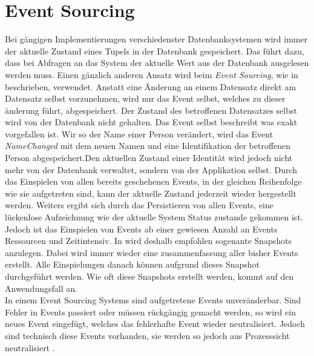 \section{Event Sourcing}
Bei gängigen Implementierungen verschiedenster Datenbanksystemen wird immer der aktuelle Zustand eines Tupels in der Datenbank gespeichert. Das führt dazu, dass bei Abfragen an das System der aktuelle Wert aus der Datenbank ausgelesen werden muss. Einen gänzlich anderen Ansatz wird beim \textit{Event Sourcing}, wie in \cite{vernon2013implementing} beschrieben, verwendet. Anstatt eine Änderung an einem Datensatz direkt am Datensatz selbst vorzunehmen, wird nur das Event selbst, welches zu dieser änderung führt, abgespeichert. Der Zustand des betroffenen Datensatzes selbst wird von der Datenbank nicht gehalten. Das Event selbst beschreibt was exakt vorgefallen ist. Wir so der Name einer Person verändert, wird das Event \textit{NameChanged} mit dem neuen Namen und eine Identifikation der betroffenen Person abgespeichert.Den aktuellen Zustand einer Identität wird jedoch nicht mehr von der Datenbank verwaltet, sondern von der Applikation selbst. Durch das Einspielen von allen bereits geschehenen Events, in der gleichen Reihenfolge wie sie aufgetreten sind, kann der aktuelle Zustand jederzeit wieder hergestellt werden. Weiters ergibt sich durch das Persistieren von allen Events, eine lückenlose Aufzeichnung wie der aktuelle System Status zustande gekommen ist. \cite{vernon2013implementing} 
Jedoch ist das Einspielen von Events ab einer gewiesen Anzahl an Events Ressourcen und Zeitintensiv. In \cite{vernon2013implementing} wird deshalb empfohlen sogenante Snapshots anzulegen. Dabei wird immer wieder eine zusammenfassung aller bisher Events erstellt. Alle Einspielungen danach können aufgrund dieses Snapshot durchgeführt werden. Wie oft diese Snapshots erstellt werden, kommt auf den Anwendungsfall an. \\
In einem Event Sourcing Systems sind aufgetretene Events unveränderbar. Sind Fehler in Events passiert oder müssen rückgängig gemacht werden, so wird ein neues Event eingefügt, welches das fehlerhafte Event wieder neutralisiert. Jedoch sind technisch diese Events vorhanden, sie werden so jedoch aus Prozesssicht neutralisiert \citep{vernon2013implementing}. 
